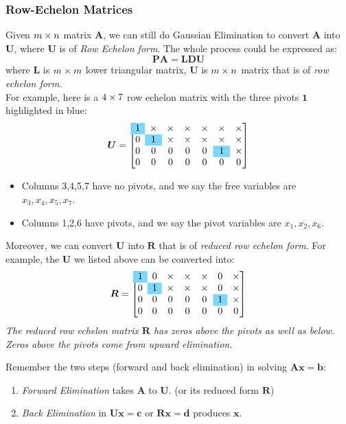 \subsubsection{Row-Echelon Matrices}
Given $m\times n$ matrix $\bm A$, we can still do Gaussian Elimination to convert $\bm A$ into $\bm U$, where $\bm U$ is of \emph{Row Echelon form}. The whole process could be expressed as:
\[
\bm{PA} = \bm{LDU}
\]
where $\bm L$ is $m\times m$ lower triangular matrix, $\bm U$ is $m\times n$ matrix that is of \textit{row echelon form}.\\
For example, here is a $4\times 7$ row echelon matrix with the three pivots $\bm 1$ highlighted in blue:
\[
\bm U = \left[
\begin{array}{@{}ccccccc@{}}
\cellcolor{cyan!50}1&\x&\x&\x&\x&\x&\x\\
0&\cellcolor{cyan!50}1&\x&\x&\x&\x&\x\\
0&0&0&0&0&\cellcolor{cyan!50}1&\x\\
0&0&0&0&0&0&0
\end{array}
\right]
\]
\begin{remark}
\begin{itemize}
\item
Columns 3,4,5,7 have no pivots, and we say the free variables are $x_3,x_4,x_5,x_7.$
\item
Columns 1,2,6 have pivots, and we say the pivot variables are $x_1,x_2,x_6.$
\end{itemize}
\end{remark}
Moreover, we can convert $\bm U$ into $\bm R$ that is of \emph{reduced row echelon form}. For example, the $\bm U$ we listed above can be converted into:
\[
\bm R = \left[
\begin{array}{@{}ccccccc@{}}
\cellcolor{cyan!50}1&0&\x&\x&\x&0&\x\\
0&\cellcolor{cyan!50}1&\x&\x&\x&0&\x\\
0&0&0&0&0&\cellcolor{cyan!50}1&\x\\
0&0&0&0&0&0&0
\end{array}
\right]
\]
\emph{The reduced row echelon matrix $\bm R$ has zeros above the pivots as well as below. Zeros above the pivots come from upward elimination.}
\begin{remark}
Remember the two steps (forward and back elimination) in solving $\bm{Ax} = \bm b$:
\begin{enumerate}
\item
\emph{Forward Elimination} takes $\bm A$ to $\bm U$. (or its reduced form $\bm R$)
\item
\emph{Back Elimination} in $\bm{Ux} = \bm c$ or $\bm{Rx} = \bm d$ produces $\bm x$.
\end{enumerate}
\end{remark}

